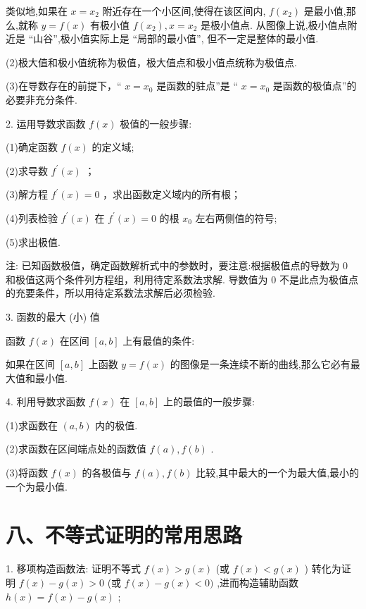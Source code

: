 类似地,如果在 $x = {x}_{2}$ 附近存在一个小区间,使得在该区间内, $f\left( {x}_{2}\right)$ 是最小值,那么,就称 $y = f\left( x\right)$ 有极小值 $f\left( {x}_{2}\right) ,x = {x}_{2}$ 是极小值点. 从图像上说,极小值点附近是 “山谷”,极小值实际上是 “局部的最小值”, 但不一定是整体的最小值.

(2)极大值和极小值统称为极值，极大值点和极小值点统称为极值点.

(3)在导数存在的前提下，“ $x = {x}_{0}$ 是函数的驻点”是 “ $x = {x}_{0}$ 是函数的极值点”的必要非充分条件.

2. 运用导数求函数 $f\left( x\right)$ 极值的一般步骤:

(1)确定函数 $f\left( x\right)$ 的定义域;

(2)求导数 ${f}^{\prime }\left( x\right)$ ；

(3)解方程 ${f}^{\prime }\left( x\right)  = 0$ ，求出函数定义域内的所有根；

(4)列表检验 ${f}^{\prime }\left( x\right)$ 在 ${f}^{\prime }\left( x\right)  = 0$ 的根 ${x}_{0}$ 左右两侧值的符号;

(5)求出极值.

注:  已知函数极值，确定函数解析式中的参数时，要注意:根据极值点的导数为 0 和极值这两个条件列方程组，利用待定系数法求解.   导数值为 0 不是此点为极值点的充要条件，所以用待定系数法求解后必须检验.

3. 函数的最大 (小) 值

函数 $f\left( x\right)$ 在区间 $\left\lbrack  {a,b}\right\rbrack$ 上有最值的条件:

如果在区间 $\left\lbrack  {a,b}\right\rbrack$ 上函数 $y = f\left( x\right)$ 的图像是一条连续不断的曲线,那么它必有最大值和最小值.

4. 利用导数求函数 $f\left( x\right)$ 在 $\left\lbrack  {a,b}\right\rbrack$ 上的最值的一般步骤:

(1)求函数在 $\left( {a,b}\right)$ 内的极值.

(2)求函数在区间端点处的函数值 $f\left( a\right) ,f\left( b\right)$ .

(3)将函数 $f\left( x\right)$ 的各极值与 $f\left( a\right) ,f\left( b\right)$ 比较,其中最大的一个为最大值,最小的一个为最小值.

\section*{八、不等式证明的常用思路}

1. 移项构造函数法: 证明不等式 $f\left( x\right)  > g\left( x\right)$ (或 $f\left( x\right)  < g\left( x\right)$ ) 转化为证明 $f\left( x\right)  - g\left( x\right)  > 0$ (或 $f\left( x\right)  - g\left( x\right)  < 0)$ ,进而构造辅助函数 $h\left( x\right)  = f\left( x\right)  - g\left( x\right)$ ;

